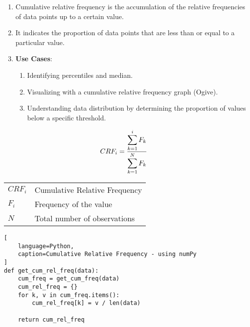 \begin{enumerate}
    \item Cumulative relative frequency is the accumulation of the relative frequencies of data points up to a certain value. \hfill \cite{common/online/chatgpt}

    \item It indicates the proportion of data points that are less than or equal to a particular value. \hfill \cite{common/online/chatgpt}

    \item \textbf{Use Cases}: \hfill \cite{statistics/book/Statistics-for-Data-Scientists/Maurits-Kaptein}
    \begin{enumerate}
        \item Identifying percentiles and median. \hfill \cite{statistics/book/Statistics-for-Data-Scientists/Maurits-Kaptein}

        \item Visualizing with a cumulative relative frequency graph (Ogive). \hfill \cite{statistics/book/Statistics-for-Data-Scientists/Maurits-Kaptein}

        \item Understanding data distribution by determining the proportion of values below a specific threshold. \hfill \cite{statistics/book/Statistics-for-Data-Scientists/Maurits-Kaptein}
    \end{enumerate}
\end{enumerate}



\begin{table}[H]
    \begin{minipage}{0.3\linewidth}
        \[
            \begin{aligned}
                CRF_i 
                    &= \dfrac{\displaystyle\sum_{k=1}^{i} F_{k}}{\displaystyle\sum_{k=1}^{N} F_{k}}
            \end{aligned}
        \]
    \end{minipage}
    \begin{minipage}{0.65\linewidth}
        \begin{table}[H]
            \begin{tabular}{l l}
                $CRF_i$ & Cumulative Relative Frequency \\
                $F_i$ & Frequency of the value \\ 
                $N$ & Total number of observations \\ 
            \end{tabular}
        \end{table}
    \end{minipage}
\end{table}

\begin{lstlisting}[
    language=Python, 
    caption=Cumulative Relative Frequency - using numPy
]
def get_cum_rel_freq(data):
    cum_freq = get_cum_freq(data)
    cum_rel_freq = {}
    for k, v in cum_freq.items():
        cum_rel_freq[k] = v / len(data)
    
    return cum_rel_freq
\end{lstlisting}

